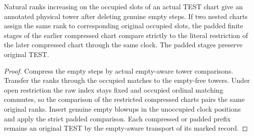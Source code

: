 \begin{theorem}
\label{hir:g8-ranked-test-compression}
\leanok
Natural ranks increasing on the occupied slots of an actual TEST
chart give an annotated physical tower after deleting genuine
empty steps. If two nested charts assign the same rank to
corresponding original occupied slots, the padded finite stages
of the earlier compressed chart compare strictly to the
literal restriction of the later compressed chart through the
same clock. The padded stages preserve original TEST.
\end{theorem}
\begin{proof}
Compress the empty steps by actual empty-aware tower comparisons.
Transfer the ranks through the occupied matches to the empty-free
towers. Under open restriction the raw index stays fixed and
occupied ordinal matching commutes, so the comparison of the
restricted compressed charts pairs the same original ranks.
Insert genuine empty blowups in the unoccupied clock positions
and apply the strict padded comparison. Each compressed or padded
prefix remains an original TEST by the empty-aware transport
of its marked record.
\end{proof}

